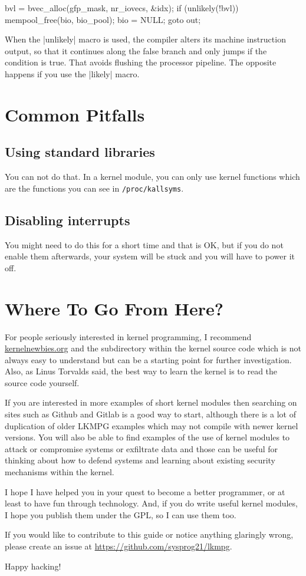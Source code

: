 \documentclass[10pt, oneside]{book}
\begin{document}
\begin{code}
bvl = bvec_alloc(gfp_mask, nr_iovecs, &idx);
if (unlikely(!bvl)) {
    mempool_free(bio, bio_pool);
    bio = NULL;
    goto out;
}
\end{code}

When the \cpp|unlikely| macro is used, the compiler alters its machine instruction output, so that it continues along the false branch and only jumps if the condition is true.
That avoids flushing the processor pipeline.
The opposite happens if you use the \cpp|likely| macro.

\section{Common Pitfalls}
\label{sec:opitfall}

\subsection{Using standard libraries}
\label{sec:using_stdlib}
You can not do that.
In a kernel module, you can only use kernel functions which are the functions you can see in \verb|/proc/kallsyms|.

\subsection{Disabling interrupts}
\label{sec:disabling_interrupts}
You might need to do this for a short time and that is OK, but if you do not enable them afterwards, your system will be stuck and you will have to power it off.

\section{Where To Go From Here?}
\label{sec:where_to_go}
For people seriously interested in kernel programming, I recommend \href{https://kernelnewbies.org}{kernelnewbies.org} and the  subdirectory within the kernel source code which is not always easy to understand but can be a starting point for further investigation.
Also, as Linus Torvalds said, the best way to learn the kernel is to read the source code yourself.

If you are interested in more examples of short kernel modules then searching on sites such as Github and Gitlab is a good way to start, although there is a lot of duplication of older LKMPG examples which may not compile with newer kernel versions.
You will also be able to find examples of the use of kernel modules to attack or compromise systems or exfiltrate data and those can be useful for thinking about how to defend systems and learning about existing security mechanisms within the kernel.

I hope I have helped you in your quest to become a better programmer, or at least to have fun through technology.
And, if you do write useful kernel modules, I hope you publish them under the GPL, so I can use them too.

If you would like to contribute to this guide or notice anything glaringly wrong, please create an issue at \url{https://github.com/sysprog21/lkmpg}.

Happy hacking!
\end{document}
